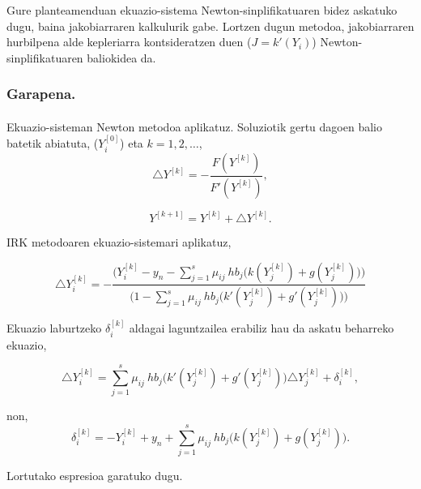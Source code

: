 Gure planteamenduan ekuazio-sistema Newton-sinplifikatuaren bidez askatuko dugu, baina jakobiarraren kalkulurik gabe. Lortzen dugun metodoa, jakobiarraren hurbilpena alde kepleriarra kontsideratzen duen ($J=k'(Y_i)$) Newton-sinplifikatuaren baliokidea da. 

\subsubsection*{Garapena.}

\paragraph*{}Ekuazio-sisteman Newton metodoa aplikatuz. Soluziotik gertu dagoen balio batetik abiatuta, ($Y_i^{[0]}$) eta $k=1,2,\dots$, 
\begin{equation*}
\triangle Y^{[k]}=-\frac{F(Y^{[k]})}{F'(Y^{[k]})},
\end{equation*}

\begin{equation*}
Y^{[k+1]}=Y^{[k]}+\triangle Y^{[k]}.
\end{equation*}

IRK metodoaren ekuazio-sistemari aplikatuz,

\begin{equation*}
\triangle Y_i^{[k]}=-\frac{\big(Y_{i}^{[k]}-y_n- \sum\limits_{j=1}^{s} \mu_{ij} \ hb_j                               \big(k(Y_{j}^{[k]})+g(Y_{j}^{[k]})\big)\big)}
                          {\big(1-\sum\limits_{j=1}^{s} \mu_{ij} \ hb_j \big(k'(Y_{j}^{[k]})+g'(Y_{j}^{[k]})\big)\big)}
\end{equation*}

Ekuazio laburtzeko $\delta_i^{[k]}$ aldagai laguntzailea erabiliz hau da askatu beharreko ekuazio,

\begin{equation}
\triangle Y_i^{[k]}=\sum\limits_{j=1}^{s} \mu_{ij} \ hb_j \big(k'(Y_{j}^{[k]})+g'(Y_{j}^{[k]})\big)\triangle Y_j^{[k]}+\delta_i^{[k]},
\end{equation}

non,
\begin{equation*}
\delta_i^{[k]}=-Y_{i}^{[k]}+y_n+ \sum\limits_{j=1}^{s} \mu_{ij} \ hb_j \big(k(Y_{j}^{[k]})+g(Y_{j}^{[k]})\big).
\end{equation*}

Lortutako espresioa garatuko dugu.

